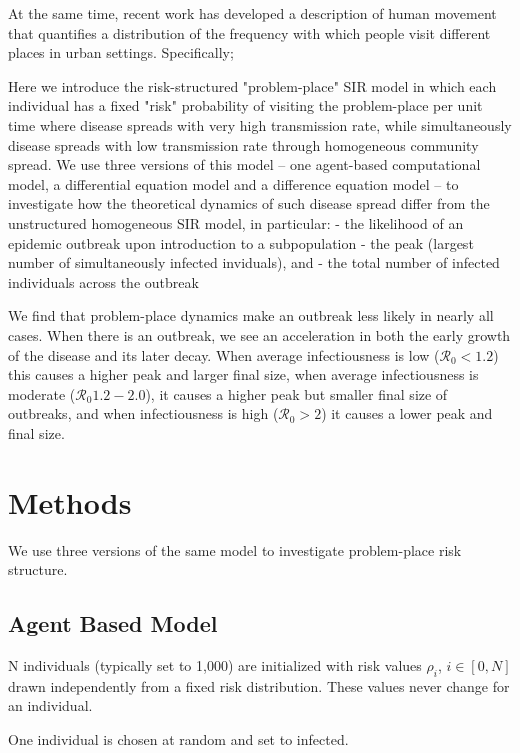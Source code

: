 \documentclass{article}
\begin{document}
At the same time, recent work has developed a description of human movement
that quantifies a distribution of the frequency with which
people visit different places in urban settings. Specifically; 

Here we introduce the risk-structured "problem-place" SIR model in which
each individual has a fixed "risk" probability of visiting the problem-place
per unit time where disease spreads with very high transmission rate, while
simultaneously disease spreads with low transmission rate through
homogeneous community spread. We use three versions of this model – one agent-based
computational model, a differential equation model and a difference equation model –
to investigate how the theoretical dynamics of such disease spread differ from
the unstructured homogeneous SIR model, in particular:
- the likelihood of an epidemic outbreak upon introduction to a subpopulation
- the peak (largest number of simultaneously infected inviduals), and
- the total number of infected individuals across the outbreak

We find that problem-place dynamics make an outbreak less likely in
nearly all cases. When there is an outbreak, we see an acceleration in
both the early growth of the disease and its later decay. When
average infectiousness is low ($\mathcal{R}_0 < 1.2$) this causes a higher peak and
larger final size, when average infectiousness is moderate ($\mathcal{R}_0 1.2 - 2.0 $), it causes
a higher peak but smaller final size of outbreaks, and when infectiousness is
high ($\mathcal{R}_0 > 2$) it causes a lower peak and final size.



\section{Methods}

We use three versions of the same model to investigate problem-place risk
structure.

\subsection{Agent Based Model}

N individuals (typically set to 1,000) are initialized with risk values
$\rho_i$, $i \in [0, N]$ drawn independently from a fixed risk distribution.
These values never change for an individual.

One individual is chosen at random and set to infected.
\end{document}
